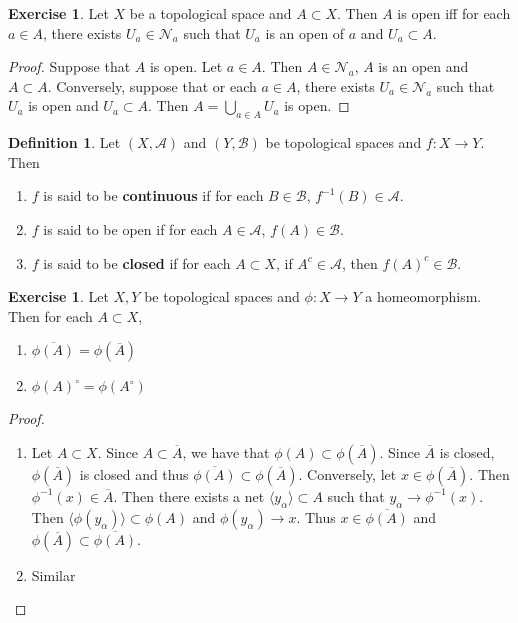 \documentclass[12pt]{amsart}
\theoremstyle{definition}
\newtheorem{defn}[definition]{Definition}
\theoremstyle{remark}
\theoremstyle{definition}
\newtheorem{ex}[definition]{Exercise}
\newcommand{\al}{\alpha}
\newcommand{\MA}{\mathcal{A}}
\newcommand{\MB}{\mathcal{B}}
\newcommand{\MN}{\mathcal{N}}
\renewcommand{\r}{\rangle}
\renewcommand{\l}{\langle}
\begin{document}
	\begin{ex}
	Let $X$ be a topological space and $A \subset X$. Then $A$ is open iff for each $a \in A$, there exists $U_a \in \MN_a$ such that $U_a$ is an open of $a$ and $U_a \subset A$.
	\end{ex}
	
	\begin{proof}
	Suppose that $A$ is open. Let $a \in A$. Then $A \in \MN_a$, $A$ is an open and $A \subset A$. Conversely, suppose that or each $a \in A$, there exists $U_a \in \MN_a$ such that $U_a$ is open and $U_a \subset A$. Then $A = \bigcup\limits_{a \in A}U_a$ is open. 
	\end{proof}
	
	\begin{defn}
		Let $(X,\MA)$ and $(Y,\MB)$ be topological spaces and $f:X \rightarrow Y$. Then 
		\begin{enumerate}
			\item $f$ is said to be \textbf{continuous} if for each $B \in \MB$, $f^{-1}(B) \in \MA$.
			\item $f$ is said to be open if for each $A \in \MA$, $f(A) \in \MB$.
			\item $f$ is said to be \textbf{closed} if for each $A \subset X$, if $A^c \in \MA$, then $f(A)^c \in \MB$.
		\end{enumerate}
	\end{defn}
	
	\begin{ex}
		Let $X, Y$ be topological spaces and $\phi: X \rightarrow Y$ a homeomorphism. Then for each $A \subset X$, 
		\begin{enumerate}
			\item $\overline{\phi(A)} = \phi(\overline{A})$  \item $\phi(A)^{\circ} = \phi(A^{\circ})$  
		\end{enumerate} 
	\end{ex}
	
	\begin{proof}\
		\begin{enumerate}
			\item Let $A \subset X$. Since $A \subset \overline{A}$, we have that $\phi(A) \subset \phi(\overline{A})$. Since $\overline{A}$ is closed, $\phi(\overline{A})$ is closed and thus $\overline{\phi(A)} \subset \phi(\overline{A})$. Conversely, let $x \in \phi(\overline{A})$. Then $\phi^{-1}(x) \in \overline{A}$. Then there exists a net $\l y_{\al}\r \subset A$ such that $y_{\al} \rightarrow \phi^{-1}(x)$. Then $\l \phi(y_{\al}) \r \subset \phi(A)$ and $\phi(y_{\al}) \rightarrow x$. Thus $x \in \overline{\phi(A)}$ and $\phi(\overline{A}) \subset \overline{\phi(A)}$.
			\item Similar
		\end{enumerate} 
	\end{proof}
	
\end{document}
